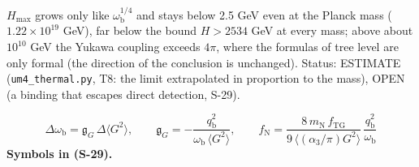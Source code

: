 \documentclass[
  10pt,
]{article}
\begin{document}
\(H_{\max}\) grows only like \(\omega_{\mathrm{b}}^{1/4}\) and stays
below 2.5 GeV even at the Planck mass (\(1.22\times10^{19}\) GeV), far
below the bound \(H > 2534\) GeV at every mass; above about \(10^{10}\)
GeV the Yukawa coupling exceeds \(4\pi\), where the formulas of tree
level are only formal (the direction of the conclusion is unchanged).
Status: ESTIMATE (\texttt{um4\_thermal.py}, T8: the limit extrapolated
in proportion to the mass), OPEN (a binding that escapes direct
detection, S-29).

\[
\Delta\omega_{\mathrm{b}} = \mathfrak{g}_{G}\,\Delta\langle G^2\rangle,\qquad
\mathfrak{g}_{G} = -\frac{q_{\mathrm{b}}^2}{\omega_{\mathrm{b}}\,\langle G^2\rangle},\qquad
f_{\mathrm{N}} = \frac{8\,m_{\mathrm{N}}\,f_{\mathrm{TG}}}{9\,\langle(\alpha_3/\pi)G^2\rangle}\,\frac{q_{\mathrm{b}}^2}{\omega_{\mathrm{b}}} \tag{S-29}
\] \textbf{Symbols in (S-29).}
\end{document}
